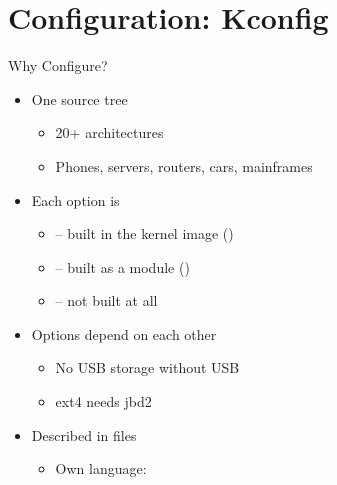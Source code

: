 
\section{Configuration: Kconfig}
\frame{\sectionpage}

\begin{frame}{Why Configure?}

  \begin{itemize}[<+->]
    \item One source tree
      \begin{itemize}[<.->]
	\item 20+ architectures
	\item Phones, servers, routers, cars, mainframes
      \end{itemize}
    \item Each option is
      \begin{itemize}[<.->]
	\item {} -- built in the kernel image ()
	\item {} -- built as a module ()
	\item {} -- not built at all
      \end{itemize}
    \item Options depend on each other
      \begin{itemize}[<.->]
	\item No USB storage without USB
	\item ext4 needs jbd2
      \end{itemize}
    \item Described in  files
      \begin{itemize}[<.->]
	\item Own language: 
      \end{itemize}
  \end{itemize}

\end{frame}

